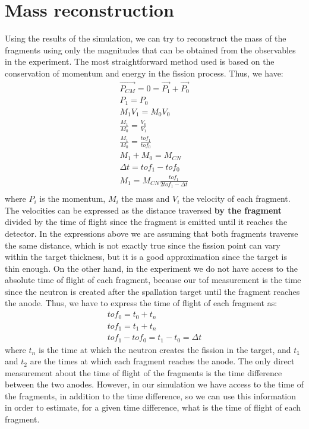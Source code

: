 \documentclass{article}
\begin{document}
\section{Mass reconstruction}
Using the results of the simulation, we can try to reconstruct the mass of the fragments using only the magnitudes that can be obtained from the observables in the experiment.
The most straightforward method used is based on the conservation of momentum and energy in the fission process. Thus, we have:
\begin{align}
    \vec{P_{CM}} = 0 = \vec{P_1} + \vec{P_0} \\
    P_1 =  P_0 \\
    M_1 V_1 = M_0 V_0 \\
    \frac{M_1}{M_0} = \frac{V_0}{V_1} \\
    \frac{M_1}{M_0} = \frac{tof_1}{tof_0} \\
    M_1 + M_0 = M_{CN} \\
    \Delta t = tof_1 - tof_0 \\
    M_1= M_{CN} \frac{tof_1}{2tof_1-\Delta t} \\
\end{align}
where $P_i$ is the momentum, $M_i$ the mass and $V_i$ the velocity of each fragment. The velocities can be expressed as the distance traversed \textbf{by the fragment} divided by the time of flight since the fragment is emitted until it reaches the detector. In the expressions above we are assuming that both fragments traverse the same distance, which is not exactly true since the fission point can vary within the target thickness, but it is a good approximation since the target is thin enough.
On the other hand, in the experiment we do not have access to the absolute time of flight of each fragment, because our tof measurement is the time since the neutron is created after the spallation target until the fragment reaches the anode. Thus, we have to express the time of flight of each fragment as:
\begin{align}
    tof_0 = t_{0} + t_{n} \\
    tof_1 = t_{1} + t_{n} \\
    tof_1 - tof_0 = t_{1} - t_{0} = \Delta t
\end{align}
where $t_n$ is the time at which the neutron creates the fission in the target, and $t_1$ and $t_2$ are the times at which each fragment reaches the anode. The only direct measurement about the time of flight of the fragments is the time difference between the two anodes. However, in our simulation we have access to the time of the fragments, in addition to the time difference, so we can use this information in order to estimate, for a given time difference, what is the time of flight of each fragment.
\end{document}
